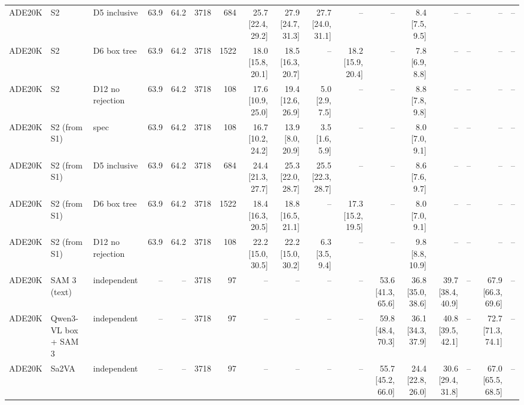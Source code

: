 \begin{tabular}{lllrrrrrrrrrrrrrl}
ADE20K & S2 & D5 inclusive & 63.9 & 64.2 & 3718 & 684 & 25.7 \scriptsize{[22.4, 29.2]} & 27.9 \scriptsize{[24.7, 31.3]} & 27.7 \scriptsize{[24.0, 31.1]} & -- & -- & 8.4 \scriptsize{[7.5, 9.5]} & -- & -- & -- & -- \\
ADE20K & S2 & D6 box tree & 63.9 & 64.2 & 3718 & 1522 & 18.0 \scriptsize{[15.8, 20.1]} & 18.5 \scriptsize{[16.3, 20.7]} & -- & 18.2 \scriptsize{[15.9, 20.4]} & -- & 7.8 \scriptsize{[6.9, 8.8]} & -- & -- & -- & -- \\
ADE20K & S2 & D12 no rejection & 63.9 & 64.2 & 3718 & 108 & 17.6 \scriptsize{[10.9, 25.0]} & 19.4 \scriptsize{[12.6, 26.9]} & 5.0 \scriptsize{[2.9, 7.5]} & -- & -- & 8.8 \scriptsize{[7.8, 9.8]} & -- & -- & -- & -- \\
ADE20K & S2 (from S1) & spec & 63.9 & 64.2 & 3718 & 108 & 16.7 \scriptsize{[10.2, 24.2]} & 13.9 \scriptsize{[8.0, 20.9]} & 3.5 \scriptsize{[1.6, 5.9]} & -- & -- & 8.0 \scriptsize{[7.0, 9.1]} & -- & -- & -- & -- \\
ADE20K & S2 (from S1) & D5 inclusive & 63.9 & 64.2 & 3718 & 684 & 24.4 \scriptsize{[21.3, 27.7]} & 25.3 \scriptsize{[22.0, 28.7]} & 25.5 \scriptsize{[22.3, 28.7]} & -- & -- & 8.6 \scriptsize{[7.6, 9.7]} & -- & -- & -- & -- \\
ADE20K & S2 (from S1) & D6 box tree & 63.9 & 64.2 & 3718 & 1522 & 18.4 \scriptsize{[16.3, 20.5]} & 18.8 \scriptsize{[16.5, 21.1]} & -- & 17.3 \scriptsize{[15.2, 19.5]} & -- & 8.0 \scriptsize{[7.0, 9.1]} & -- & -- & -- & -- \\
ADE20K & S2 (from S1) & D12 no rejection & 63.9 & 64.2 & 3718 & 108 & 22.2 \scriptsize{[15.0, 30.5]} & 22.2 \scriptsize{[15.0, 30.2]} & 6.3 \scriptsize{[3.5, 9.4]} & -- & -- & 9.8 \scriptsize{[8.8, 10.9]} & -- & -- & -- & -- \\
\midrule
ADE20K & SAM 3 (text) & independent & -- & -- & 3718 & 97 & -- & -- & -- & -- & 53.6 \scriptsize{[41.3, 65.6]} & 36.8 \scriptsize{[35.0, 38.6]} & 39.7 \scriptsize{[38.4, 40.9]} & -- & 67.9 \scriptsize{[66.3, 69.6]} & -- \\
ADE20K & Qwen3-VL box + SAM 3 & independent & -- & -- & 3718 & 97 & -- & -- & -- & -- & 59.8 \scriptsize{[48.4, 70.3]} & 36.1 \scriptsize{[34.3, 37.9]} & 40.8 \scriptsize{[39.5, 42.1]} & -- & 72.7 \scriptsize{[71.3, 74.1]} & -- \\
ADE20K & Sa2VA & independent & -- & -- & 3718 & 97 & -- & -- & -- & -- & 55.7 \scriptsize{[45.2, 66.0]} & 24.4 \scriptsize{[22.8, 26.0]} & 30.6 \scriptsize{[29.4, 31.8]} & -- & 67.0 \scriptsize{[65.5, 68.5]} & -- \\

\end{tabular}

